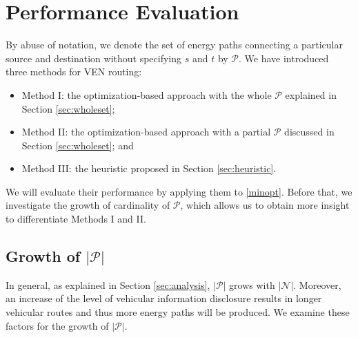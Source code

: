 \documentclass[journal]{IEEEtran}
\begin{document}
\section{Performance Evaluation} \label{sec:performance}

By abuse of notation, we denote the set of energy paths connecting a particular source and destination without specifying $s$ and $t$ by $\mathcal{P}$. We have introduced three methods for VEN routing:
\begin{itemize}
	\item Method I: the optimization-based approach with the whole $\mathcal{P}$ explained in Section \ref{sec:wholeset};
	\item Method II: the optimization-based approach with a partial $\mathcal{P}$ discussed in Section \ref{sec:wholeset}; and
	\item Method III: the heuristic proposed in Section \ref{sec:heuristic}.
\end{itemize} 
We will evaluate their performance by applying them to \eqref{minopt}. Before that, we investigate the growth of cardinality of $\mathcal{P}$, which allows us to obtain more insight to differentiate Methods I and II. 

\subsection{Growth of $|\mathcal{P}|$}
In general, as explained in Section \ref{sec:analysis},  $|\mathcal{P}|$ grows with $|\mathcal{N}|$. Moreover, an increase of the level of vehicular information disclosure results in longer vehicular routes and thus more energy paths will be produced. We examine these factors for the growth of  $|\mathcal{P}|$.
\end{document}
